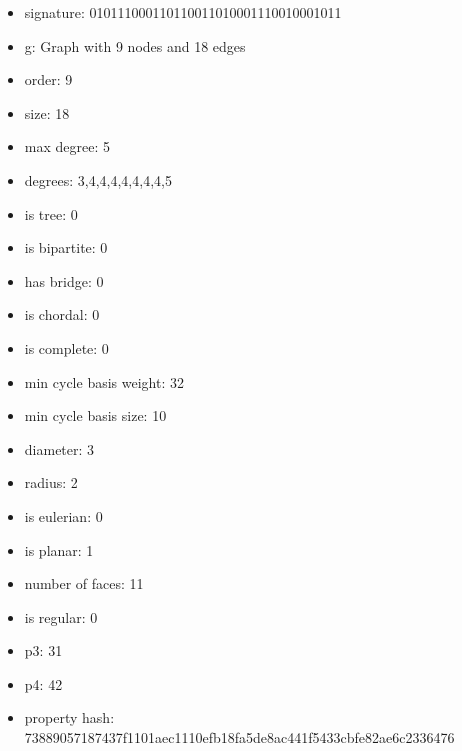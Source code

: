 \newpage
\begin{figure}
\end{figure}
\begin{itemize}
\item signature: 010111000110110011010001110010001011
\item g: Graph with 9 nodes and 18 edges
\item order: 9
\item size: 18
\item max degree: 5
\item degrees: 3,4,4,4,4,4,4,4,5
\item is tree: 0
\item is bipartite: 0
\item has bridge: 0
\item is chordal: 0
\item is complete: 0
\item min cycle basis weight: 32
\item min cycle basis size: 10
\item diameter: 3
\item radius: 2
\item is eulerian: 0
\item is planar: 1
\item number of faces: 11
\item is regular: 0
\item p3: 31
\item p4: 42
\item property hash: 73889057187437f1101aec1110efb18fa5de8ac441f5433cbfe82ae6c2336476
\end{itemize}
